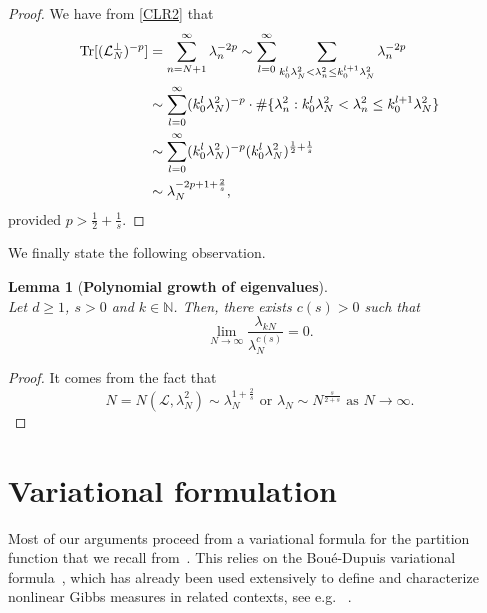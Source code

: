 \documentclass[%
11pt,  reqno]{amsart}
\newtheorem{lemma}[theorem]{Lemma}
\theoremstyle{remarkstyle}
\newcommand{\1}{\hspace{0.2mm}\text{I}\hspace{0.2mm}}
\renewcommand{\L}{\mathcal{L}}
\newcommand{\ld}{\lambda}
\newcommand{\N}{\mathbb{N}}
\numberwithin{equation}{section}
\numberwithin{theorem}{section}
\begin{document}
	\begin{proof}
		We have from \eqref{CLR2} that
		\begin{align}
			\begin{split}
				{\rm{Tr}} [(\L^\perp_N)^{-p}] & = \sum_{n = N+1}^\infty \ld_n^{-2p}  \sim \sum_{l=0}^{\infty} \sum_{k_0^{l} \ld_N^2  < \ld_n^2 \le k_0^{l+1} \ld_N^2}  \ld_n^{-2p} \\
				& \sim \sum_{l=0}^{\infty} (k_0^{l} \ld_N^2)^{-p} \cdot \#  \{\ld_n^2: k_0^{l} \ld_N^2 < \ld_n^2 \le k_0^{l+1} \ld_N^2\} \\
				& \sim \sum_{l=0}^{\infty} (k_0^{l} \ld_N^2)^{-p} (k_0^{l} \ld_N^2)^{ \frac12+ \frac1s} \\
				& \sim \ld_N^{-2p + 1 + \frac2s},
			\end{split}
		\end{align}
		provided $p > \frac12 + \frac1s$.
	\end{proof}
	
	We finally state the following observation.
	
	\begin{lemma}[\textbf{Polynomial growth of eigenvalues}]\label{LEM:asym}\mbox{}\\
		Let $d\geq 1$, $s > 0$ and $k\in \N$. Then, there exists $c(s) > 0$ such that
		\[
		\lim_{N\to \infty} \frac{\ld_{kN}}{\ld_{N}^{c(s)}} = 0.
		\]
	\end{lemma}
	
	\begin{proof}
		It comes from the fact that
		$$
		N = N(\L,\ld_N^2) \sim \ld_N^{1+\frac2s} \text{ or } \ld_N \sim N^{\frac{s}{2+s}} \text{ as } N \to \infty.
		$$
	\end{proof}
	
	
	
	\section{Variational formulation}\label{sec:variational}
	Most of our arguments proceed from a variational formula for the partition function that we recall from~\cite{BD98}. This relies on the Bou\'e-Dupuis variational formula~\cite{BD98,Ustunel14,Zhang09,Borell-00,Lehec-13}, which has already been used extensively to define and characterize nonlinear Gibbs measures in related contexts, see e.g. ~\cite{BG20,OOT, OOT1}.
	
\end{document}
